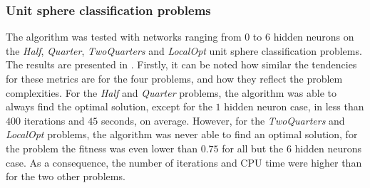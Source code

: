 \subsubsection{Unit sphere classification problems}

The algorithm was tested with networks ranging from $0$ to $6$ hidden neurons on the \textit{Half}, \textit{Quarter}, \textit{TwoQuarters} and \textit{LocalOpt} unit sphere classification problems.
The results are presented in . Firstly, it can be noted how similar the tendencies for these metrics are for the four problems, and how they reflect the problem
complexities. For the \textit{Half} and \textit{Quarter} problems, the algorithm was able to always find the optimal solution, except for the $1$ hidden neuron case, in less than
$400$ iterations and $45$ seconds, on average. However, for the \textit{TwoQuarters} and \textit{LocalOpt} problems, the algorithm was never able to find an optimal solution, for the
 problem the fitness was even lower than $0.75$ for all but the $6$ hidden neurons case. As a consequence, the number of iterations and CPU time were higher than
for the two other problems.

